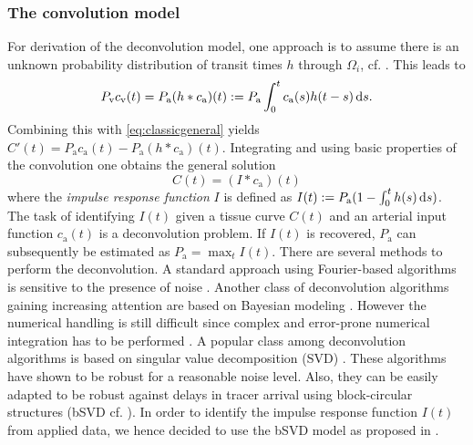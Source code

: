 \documentclass[final,5p,times,twocolumn]{elsarticle}
\begin{document}
	

	\subsubsection{The convolution model}\label{sec:conv}
	For derivation of the deconvolution model, one approach is to assume there is an unknown probability distribution of transit times $h$ through $\Omega_i$, cf. \cite{sourbron13}. 
	This leads to
	\begin{equation}
		P_{\mathrm{v}}c_{\mathrm{v}}(t) = P_{\mathrm{a}}(h\ast c_\mathrm{a})(t) := P_{\mathrm{a}}\int_0^t c_\mathrm{a}(s) h(t-s) \,\mathrm{d} s.
	\end{equation}
	Combining this with \eqref{eq:classicgeneral} yields $C'(t) = P_{\mathrm{a}}c_\mathrm{a}(t)-P_{\mathrm{a}} (h\ast c_\mathrm{a})(t)$.
	Integrating and using basic properties of the convolution one obtains the general solution
	\begin{equation}
		C(t) = (I\ast c_\mathrm{a})(t)
		\label{eq:conv}
	\end{equation}
	where the \emph{impulse response function} $I$ is defined as $I(t) := P_{\mathrm{a}}(1-\int_0^t h(s) \,\mathrm{d} s)$.
	The task of identifying $I(t)$ given a tissue curve $C(t)$ and an arterial input function $c_\mathrm{a}(t)$ is a deconvolution problem.
	If $I(t)$ is recovered, $P_{\mathrm{a}}$ can subsequently be estimated as $P_{\mathrm{a}} = \max_{t} I(t)$.
	There are several methods to perform the deconvolution.
	A standard approach using Fourier-based algorithms is sensitive to the presence of noise \cite{ostergaard96}.
	Another class of deconvolution algorithms gaining increasing attention are based on Bayesian modeling \cite{boutelier12}.
	However the numerical handling is still difficult since complex and error-prone numerical integration has to be performed \cite{boutelier12}.
	A popular class among deconvolution algorithms is based on singular value decomposition (SVD) \cite{ostergaard96}.
	These algorithms have shown to be robust for a reasonable noise level.
	Also, they can be easily adapted to be robust against delays in tracer arrival using block-circular structures (bSVD cf. \cite{wu03}).
	In order to identify the impulse response function $I(t)$ from applied data, we hence decided to use the bSVD model as proposed in \cite{wu03}.

	
	
\end{document}
